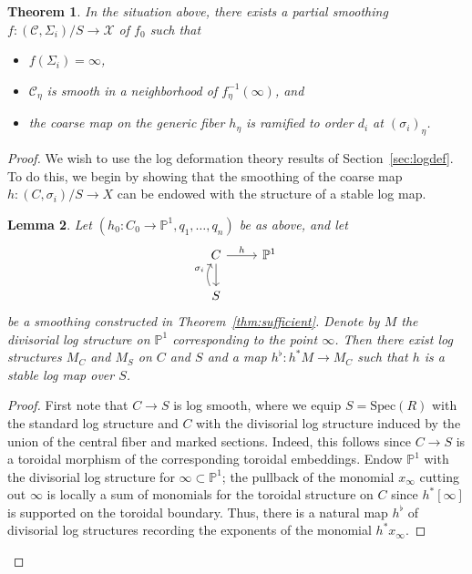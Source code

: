 \documentclass[11pt]{amsart}
\numberwithin{equation}{section}
\newtheorem{theorem}{Theorem}[section]
\newtheorem{lemma}[theorem]{Lemma}
\theoremstyle{definition}
\theoremstyle{remark}
\newcommand{\bP}{{\mathbb P}}
\newcommand{\calX}{\mathcal X}
\newcommand{\calC}{\mathcal C}
\newcommand{\Spec}{\mathrm{Spec}}
\begin{document}
\begin{theorem}\label{thm:local} In the situation above, there exists a partial smoothing $f \colon  (\calC, \Sigma_i)/S \to \calX$ of $f_0$ such that 
\begin{itemize} 
\item $f(\Sigma_i) = \infty$,
\item $\calC_\eta$ is smooth in a neighborhood of $f_\eta^{-1}(\infty)$, and 
\item the coarse map on the generic fiber $h_\eta$ is ramified to order $d_i$ at $(\sigma_i)_\eta$. 

\end{itemize}
\end{theorem}

\begin{proof} We wish to use the log deformation theory results of Section~\ref{sec:logdef}. To do this, we begin by showing that the smoothing of the coarse map $h \colon  (C, \sigma_i)/S \to X$ can be endowed with the structure of a stable log map. 

\begin{lemma}\label{log:smoothing} Let $(h_0 \colon  C_0 \to \bP^1, q_1, \ldots, q_n)$ be as above, and let
\[ \begin{tikzcd}
C \arrow{r}{h}  \arrow[d] & \bP^1 \\ 
  S \arrow[u, bend left, "\sigma_i"] 
\end{tikzcd} \] 
be a smoothing constructed in Theorem~\ref{thm:sufficient}. Denote by $M$ the divisorial log structure on $\bP^1$ corresponding to the point $\infty$. Then there exist log structures $M_C$ and $M_S$ on $C$ and $S$ and a map $h^\flat \colon  h^*M \to M_C$ such that $h$ is a stable log map over $S$.
\end{lemma}

\begin{proof} First note that $C \to S$ is log smooth, where we equip $S = \Spec(R)$ with the standard log structure and $C$ with the divisorial log structure induced by the union of the central fiber and marked sections. Indeed, this follows since $C \to S$ is a toroidal morphism of the corresponding toroidal embeddings. Endow $\bP^1$ with the divisorial log structure for $\infty \subset \bP^1$;   the pullback of the monomial $x_\infty$ cutting out $\infty$ is locally a sum of monomials for the toroidal structure on $C$ since $h^*[\infty]$ is supported on the toroidal boundary. Thus, there is a natural map $h^\flat$ of divisorial log structures recording the exponents of the monomial $h^*x_\infty$. \end{proof}


\end{proof}
\end{document}
